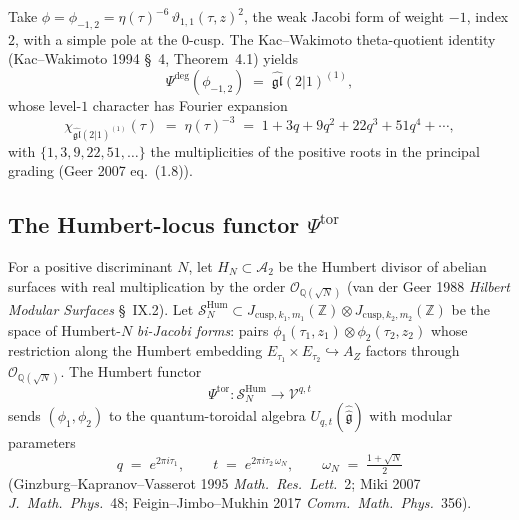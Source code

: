 \begin{example}
\label{ex:psi-deg-gl21}
Take $\phi = \phi_{-1, 2} = \eta(\tau)^{-6}\,
\vartheta_{1,1}(\tau, z)^2$, the weak Jacobi form of weight $-1$,
index $2$, with a simple pole at the $0$-cusp. The Kac--Wakimoto
theta-quotient identity (Kac--Wakimoto 1994 \S~4, Theorem~4.1)
yields
\[
\Psi^{\deg}(\phi_{-1, 2}) \;=\; \widehat{\mathfrak{gl}}(2|1)^{(1)},
\]
whose level-$1$ character has Fourier expansion
\[
\chi_{\widehat{\mathfrak{gl}}(2|1)^{(1)}}(\tau) \;=\;
\eta(\tau)^{-3} \;=\; 1 + 3q + 9q^2 + 22q^3 + 51q^4 +\cdots,
\]
with $\{1, 3, 9, 22, 51, \ldots\}$ the multiplicities of the
positive roots in the principal grading (Geer 2007 eq.~(1.8)).
\end{example}

\subsection{The Humbert-locus functor \texorpdfstring{$\Psi^{\mathrm{tor}}$}{Psi-tor}}
\label{subsec:psi-tor}

\begin{definition}
\label{def:psi-tor}
For a positive discriminant $N$, let $H_N \subset \mathcal A_2$
be the Humbert divisor of abelian surfaces with real
multiplication by the order $\mathcal O_{\mathbb Q(\sqrt N)}$
(van der Geer 1988 \textit{Hilbert Modular Surfaces} \S~IX.2).
Let
$\mathcal S^{\mathrm{Hum}}_N
\subset J_{\mathrm{cusp},k_1,m_1}(\mathbb Z) \otimes
J_{\mathrm{cusp},k_2,m_2}(\mathbb Z)$
be the space of Humbert-$N$ \emph{bi-Jacobi forms}: pairs
$\phi_1(\tau_1, z_1)\otimes\phi_2(\tau_2, z_2)$ whose
restriction along the Humbert embedding
$E_{\tau_1}\times E_{\tau_2}\hookrightarrow A_Z$ factors
through $\mathcal O_{\mathbb Q(\sqrt N)}$. The Humbert functor
\[
\Psi^{\mathrm{tor}} : \mathcal S^{\mathrm{Hum}}_N
\longrightarrow \mathcal V^{q,t}
\]
sends $(\phi_1, \phi_2)$ to the quantum-toroidal algebra
$U_{q, t}(\widehat{\widehat{\mathfrak g}})$ with modular
parameters
\[
q \;=\; e^{2\pi i \tau_1},\qquad
t \;=\; e^{2\pi i \tau_2\, \omega_N},\qquad
\omega_N \;=\; \tfrac{1 + \sqrt N}{2}
\]
(Ginzburg--Kapranov--Vasserot 1995 \textit{Math.~Res.~Lett.}~2;
Miki 2007 \textit{J.~Math.~Phys.}~48; Feigin--Jimbo--Mukhin 2017
\textit{Comm.~Math.~Phys.}~356).
\end{definition}


